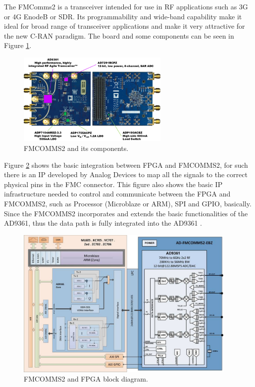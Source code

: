 The FMComms2 is a transceiver intended for use in RF applications such  as 3G or
4G EnodeB or SDR. Its programmability and wide-band capability make it ideal for
broad range of transceiver applications and make it very attractive for the new
C-RAN paradigm. The board and some components can be seen in Figure
\ref{fig:fmcomm}.

\begin{figure}[htbp]
    \centering
    \includegraphics[width=0.65\textwidth]{./figures/fmcomms2_pic}
    \caption{ FMCOMMS2 and its components.
    \label{fig:fmcomm}}
\end{figure}

Figure \ref{fig:fmcommbd} shows the basic integration between FPGA and FMCOMMS2,
for such there is an IP developed by Analog Devices to map all the signals to
the correct physical pins in the FMC connector. This figure also shows the
basic IP infrastructure needed to control and communicate between the FPGA and
FMCOMMS2, such as Processor (Microblaze or ARM), SPI and GPIO, basically. Since
the FMCOMMS2 incorporates and extends the basic functionalities of the AD9361,
thus the data path is fully integrated into the AD9361 \cite{web:fmcomms2wiki}.

\begin{figure}[htbp]
    \centering
    \includegraphics[width=0.95\textwidth]{./figures/fmcomms2_bd}
    \caption{ FMCOMMS2 and FPGA block diagram.
    \label{fig:fmcommbd}}
\end{figure}


